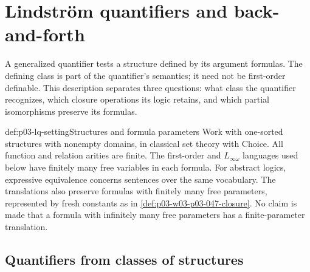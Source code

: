 \section{Lindstr\"om quantifiers and back-and-forth}
\label{sec:p03-lindstrom-quantifiers}

A generalized quantifier tests a structure defined by its argument
formulas. The defining class is part of the quantifier's semantics;
it need not be first-order definable. This description separates three
questions: what class the quantifier recognizes, which closure operations
its logic retains, and which partial isomorphisms preserve its formulas.

\begin{hbconvention}{def:p03-lq-setting}{Structures and formula parameters}
Work with one-sorted structures with nonempty domains, in classical set
theory with Choice. All function and relation arities are finite.
The first-order and \(L_{\infty\omega}\) languages used below have
finitely many free variables in each formula. For abstract logics,
expressive equivalence concerns sentences over the same vocabulary.
The translations also preserve formulas with finitely many free
parameters, represented by fresh constants as in
\cref{def:p03-w03-p03-047-closure}. No claim is made that a formula
with infinitely many free parameters has a finite-parameter translation.
\end{hbconvention}

\subsection{Quantifiers from classes of structures}

